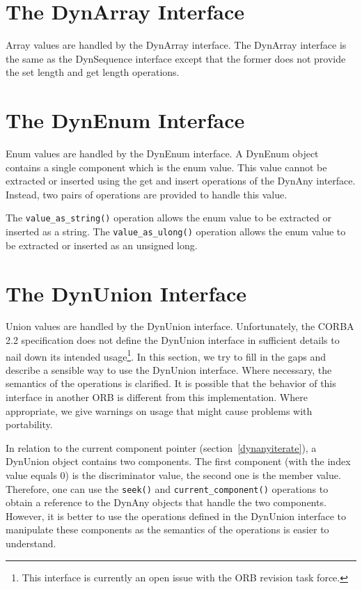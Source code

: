 \documentclass[11pt,twoside,a4paper]{book}
\newcommand{\op}[1]{\texttt{#1()}}
\begin{document}
\section{The DynArray Interface}

Array values are handled by the DynArray interface. The DynArray
interface is the same as the DynSequence interface except that the
former does not provide the set length and get length operations.

\section{The DynEnum Interface}

Enum values are handled by the DynEnum interface. A DynEnum object
contains a single component which is the enum value. This value cannot
be extracted or inserted using the get and insert operations of the
DynAny interface. Instead, two pairs of operations are provided to
handle this value.

The \op{value\_as\_string} operation allows the enum value to be
extracted or inserted as a string. The \op{value\_as\_ulong} operation
allows the enum value to be extracted or inserted as an unsigned long.


\section{The DynUnion Interface}

Union values are handled by the DynUnion interface. Unfortunately, the
CORBA 2.2 specification does not define the DynUnion interface in
sufficient details to nail down its intended usage\footnote{This
interface is currently an open issue with the ORB revision task
force.}. In this section, we try to fill in the gaps and describe a
sensible way to use the DynUnion interface. Where necessary, the
semantics of the operations is clarified. It is possible that the
behavior of this interface in another ORB is different from this
implementation. Where appropriate, we give warnings on usage that
might cause problems with portability.

In relation to the current component pointer
(section~\ref{dynanyiterate}), a DynUnion object contains two
components. The first component (with the index value equals 0) is the
discriminator value, the second one is the member value.  Therefore,
one can use the \op{seek} and \op{current\_component} operations to
obtain a reference to the DynAny objects that handle the two
components. However, it is better to use the operations defined in the
DynUnion interface to manipulate these components as the semantics of
the operations is easier to understand.
\end{document}
